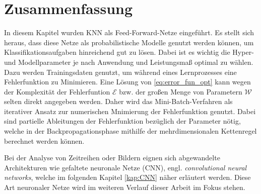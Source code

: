 \section{Zusammenfassung}
\label{abs:NN_conc}
In diesem Kapitel wurden KNN als Feed-Forward-Netze eingeführt. Es stellt sich heraus, dass diese Netze als probabilistische Modelle genutzt werden können, um Klassifikationsaufgaben hinreichend gut zu lösen. Dabei ist es wichtig die Hyper- und Modellparameter je nach Anwendung und Leistungsmaß optimal zu wählen. Dazu werden Trainingsdaten genutzt, um während eines Lernprozesses eine Fehlerfunktion zu Minimieren. Eine Lösung von \ref{eq:error_fun_opt} kann wegen der Komplexität der Fehlerfuntion $\mathcal{E}$ bzw. der großen Menge von Parametern $\mathcal{W}$ selten direkt angegeben werden\cite{blum1992training}. Daher wird das Mini-Batch-Verfahren als iterativer Ansatz zur numerischen Mnimierung der Fehlerfunktion genutzt. Dabei sind partielle Ableitungen der Fehlerfunktion bezüglich der Parameter nötig, welche in der Backpropagationsphase mithilfe der mehrdimensionalen Kettenregel berechnet werden können. 

Bei der Analyse von Zeitreihen oder Bildern eignen sich abgewandelte Architekturen wie gefaltete neuronale Netze (CNN), engl. \textit{convolutional neural networks}, welche im folgenden Kapitel \ref{kap:CNN} näher erläutert werden. Diese Art neuronaler Netze wird im weiteren Verlauf dieser Arbeit im Fokus stehen.


    





